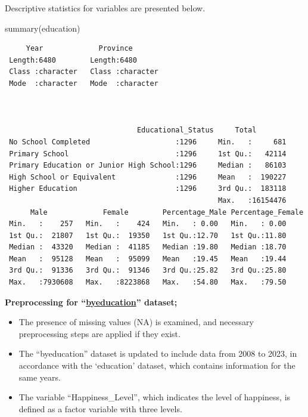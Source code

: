 \documentclass[
  11pt,
  a4paper,
  DIV=11,
  numbers=noendperiod]{scrartcl}
\newenvironment{Shaded}{\begin{snugshade}}{\end{snugshade}}
\newcommand{\FunctionTok}[1]{\textcolor[rgb]{0.28,0.35,0.67}{#1}}
\newcommand{\NormalTok}[1]{\textcolor[rgb]{0.00,0.23,0.31}{#1}}
\begin{document}
Descriptive statistics for variables are presented below.

\begin{Shaded}
\begin{Highlighting}[]
 \FunctionTok{summary}\NormalTok{(education)}
\end{Highlighting}
\end{Shaded}

\begin{verbatim}
     Year             Province        
 Length:6480        Length:6480       
 Class :character   Class :character  
 Mode  :character   Mode  :character  
                                      
                                      
                                      
                               Educational_Status     Total         
 No School Completed                    :1296     Min.   :     681  
 Primary School                         :1296     1st Qu.:   42114  
 Primary Education or Junior High School:1296     Median :   86103  
 High School or Equivalent              :1296     Mean   :  190227  
 Higher Education                       :1296     3rd Qu.:  183118  
                                                  Max.   :16154476  
      Male             Female        Percentage_Male Percentage_Female
 Min.   :    257   Min.   :    424   Min.   : 0.00   Min.   : 0.00    
 1st Qu.:  21807   1st Qu.:  19350   1st Qu.:12.70   1st Qu.:11.80    
 Median :  43320   Median :  41185   Median :19.80   Median :18.70    
 Mean   :  95128   Mean   :  95099   Mean   :19.45   Mean   :19.44    
 3rd Qu.:  91336   3rd Qu.:  91346   3rd Qu.:25.82   3rd Qu.:25.80    
 Max.   :7930608   Max.   :8223868   Max.   :54.80   Max.   :79.50    
\end{verbatim}

\textbf{Preprocessing for
``\href{https://github.com/emu-hacettepe-analytics/emu660-spring2025-ecavusgil}{byeducation}''
dataset;}

\begin{itemize}
\item
  The presence of missing values (NA) is examined, and necessary
  preprocessing steps are applied if they exist.
\item
  The ``byeducation'' dataset is updated to include data from 2008 to
  2023, in accordance with the `education' dataset, which contains
  information for the same years.
\item
  The variable ``Happiness\_Level'', which indicates the level of
  happiness, is defined as a factor variable with three levels.
\end{itemize}
\end{document}
